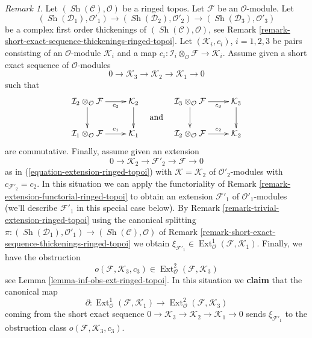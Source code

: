 \documentclass{stacks-project}
\theoremstyle{plain}
\theoremstyle{definition}
\theoremstyle{remark}
\newtheorem{remark}[subsection]{Remark}
\numberwithin{equation}{subsection}
\def\Ext{\mathop{\mathrm{Ext}}\nolimits}
\def\Sh{\mathop{\mathit{Sh}}\nolimits}
\begin{document}
\begin{remark}
\label{remark-complex-thickenings-and-ses-modules-ringed-topoi}
Let $(\Sh(\mathcal{C}), \mathcal{O})$ be a ringed topos.
Let $\mathcal{F}$ be an $\mathcal{O}$-module. Let
$$
(\Sh(\mathcal{D}_1), \mathcal{O}'_1) \to
(\Sh(\mathcal{D}_2), \mathcal{O}'_2) \to
(\Sh(\mathcal{D}_3), \mathcal{O}'_3)
$$
be a complex first order thickenings of $(\Sh(\mathcal{C}), \mathcal{O})$, see
Remark \ref{remark-short-exact-sequence-thickenings-ringed-topoi}.
Let $(\mathcal{K}_i, c_i)$, $i = 1, 2, 3$ be pairs consisting of
an $\mathcal{O}$-module $\mathcal{K}_i$ and a map
$c_i : \mathcal{I}_i \otimes_\mathcal{O} \mathcal{F} \to
\mathcal{K}_i$. Assume given a short exact sequence
of $\mathcal{O}$-modules
$$
0 \to \mathcal{K}_3 \to \mathcal{K}_2 \to \mathcal{K}_1 \to 0
$$
such that
$$
\vcenter{
\xymatrix{
\mathcal{I}_2 \otimes_\mathcal{O} \mathcal{F}
\ar[r]_-{c_2} \ar[d] &
\mathcal{K}_2 \ar[d] \\
\mathcal{I}_1 \otimes_\mathcal{O} \mathcal{F}
\ar[r]^-{c_1} &
\mathcal{K}_1
}
}
\quad\text{and}\quad
\vcenter{
\xymatrix{
\mathcal{I}_3 \otimes_\mathcal{O} \mathcal{F}
\ar[r]_-{c_3} \ar[d] &
\mathcal{K}_3 \ar[d] \\
\mathcal{I}_2 \otimes_\mathcal{O} \mathcal{F}
\ar[r]^-{c_2} &
\mathcal{K}_2
}
}
$$
are commutative. Finally, assume given an extension
$$
0 \to \mathcal{K}_2 \to \mathcal{F}'_2 \to \mathcal{F} \to 0
$$
as in (\ref{equation-extension-ringed-topoi})
with $\mathcal{K} = \mathcal{K}_2$
of $\mathcal{O}'_2$-modules with $c_{\mathcal{F}'_2} = c_2$.
In this situation we can apply the functoriality of
Remark \ref{remark-extension-functorial-ringed-topoi}
to obtain an extension $\mathcal{F}'_1$ of $\mathcal{O}'_1$-modules
(we'll describe $\mathcal{F}'_1$ in this special case below). By
Remark \ref{remark-trivial-extension-ringed-topoi}
using the canonical splitting
$\pi : (\Sh(\mathcal{D}_1), \mathcal{O}'_1) \to
(\Sh(\mathcal{C}), \mathcal{O})$ of
Remark \ref{remark-short-exact-sequence-thickenings-ringed-topoi}
we obtain
$\xi_{\mathcal{F}'_1} \in
\Ext^1_\mathcal{O}(\mathcal{F}, \mathcal{K}_1)$.
Finally, we have the obstruction
$$
o(\mathcal{F}, \mathcal{K}_3, c_3) \in
\Ext^2_\mathcal{O}(\mathcal{F}, \mathcal{K}_3)
$$
see Lemma \ref{lemma-inf-obs-ext-ringed-topoi}.
In this situation we {\bf claim} that the canonical map
$$
\partial :
\Ext^1_\mathcal{O}(\mathcal{F}, \mathcal{K}_1)
\longrightarrow
\Ext^2_\mathcal{O}(\mathcal{F}, \mathcal{K}_3)
$$
coming from the short exact sequence
$0 \to \mathcal{K}_3 \to \mathcal{K}_2 \to \mathcal{K}_1 \to 0$
sends $\xi_{\mathcal{F}'_1}$
to the obstruction class $o(\mathcal{F}, \mathcal{K}_3, c_3)$.


\end{remark}
\end{document}
